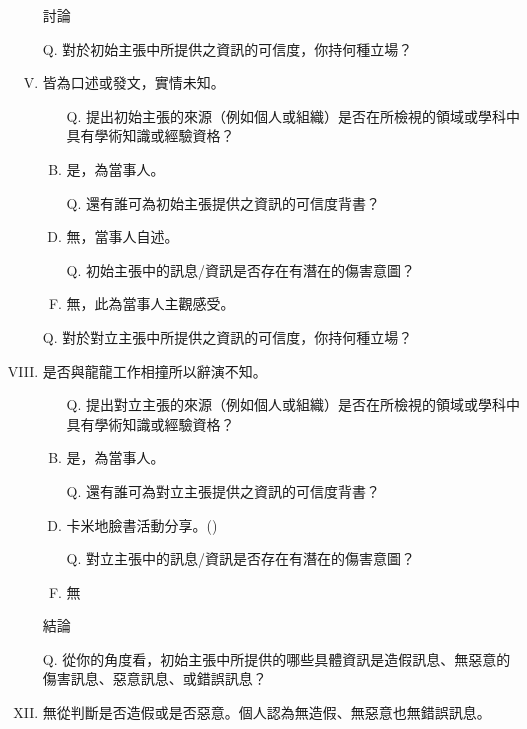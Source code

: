 \documentclass[a4paper, 12pt]{article}
\begin{document}
\begin{enumerate}[I.]
    \item [] %
    \item [] %
    \item [] 討論
    \item [Q.] 對於{\color{blue}初始主張}中所提供之資訊的可信度，你持何種立場？
    \item 皆為口述或發文，實情未知。
          \begin{enumerate}[A.]
              \item [Q.]提出{\color{blue}初始主張}的來源（例如個人或組織）是否在所檢視的領域或學科中具有學術知識或經驗資格？
              \item 是，為當事人。
              \item [Q.]還有誰可為{\color{blue}初始主張}提供之資訊的可信度背書？
              \item 無，當事人自述。
              \item [Q.]{\color{blue}初始主張}中的訊息/資訊是否存在有潛在的傷害意圖？
              \item 無，此為當事人主觀感受。
          \end{enumerate}
    \item []
    \item [Q.] 對於{\color{red}對立主張}中所提供之資訊的可信度，你持何種立場？
    \item 是否與龍龍工作相撞所以辭演不知。
          \begin{enumerate}[A.]
              \item [Q.] 提出{\color{red}對立主張}的來源（例如個人或組織）是否在所檢視的領域或學科中具有學術知識或經驗資格？
              \item 是，為當事人。
              \item [Q.] 還有誰可為{\color{red}對立主張}提供之資訊的可信度背書？
              \item 卡米地臉書活動分享。(\cite{10158175426336462,froggyroast})
              \item [Q.] {\color{red}對立主張}中的訊息/資訊是否存在有潛在的傷害意圖？
              \item 無
          \end{enumerate}
    \item [] %
    \item [] 結論
    \item [Q.] 從你的角度看，{\color{blue}初始主張}中所提供的哪些具體資訊是造假訊息、無惡意的傷害訊息、惡意訊息、或錯誤訊息？
    \item 無從判斷是否造假或是否惡意。個人認為無造假、無惡意也無錯誤訊息。

\end{enumerate}
\end{document}
